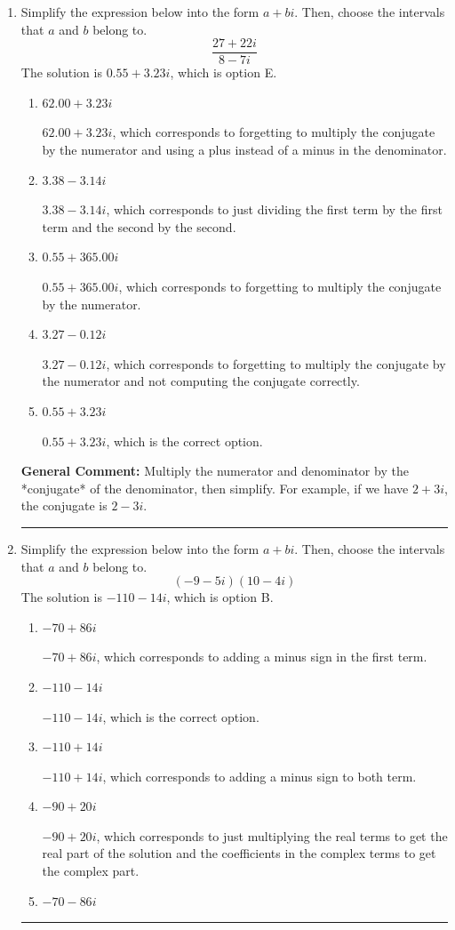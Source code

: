 \documentclass{extbook}[14pt]
\newcommand{\litem}[1]{\item #1

\rule{\textwidth}{0.4pt}}
\begin{document}
\begin{enumerate}\litem{
Simplify the expression below into the form $a+bi$. Then, choose the intervals that $a$ and $b$ belong to.
\[ \frac{27  + 22 i}{8  - 7 i} \]The solution is \( 0.55  + 3.23 i \), which is option E.\begin{enumerate}[label=\Alph*.]
\item \( 62.00  + 3.23 i \)

 $62.00  + 3.23 i$, which corresponds to forgetting to multiply the conjugate by the numerator and using a plus instead of a minus in the denominator.
\item \( 3.38  - 3.14 i \)

 $3.38  - 3.14 i$, which corresponds to just dividing the first term by the first term and the second by the second.
\item \( 0.55  + 365.00 i \)

 $0.55  + 365.00 i$, which corresponds to forgetting to multiply the conjugate by the numerator.
\item \( 3.27  - 0.12 i \)

 $3.27  - 0.12 i$, which corresponds to forgetting to multiply the conjugate by the numerator and not computing the conjugate correctly.
\item \( 0.55  + 3.23 i \)

 $0.55  + 3.23 i$, which is the correct option.
\end{enumerate}

\textbf{General Comment:} Multiply the numerator and denominator by the *conjugate* of the denominator, then simplify. For example, if we have $2+3i$, the conjugate is $2-3i$.
}
\litem{
Simplify the expression below into the form $a+bi$. Then, choose the intervals that $a$ and $b$ belong to.
\[ (-9  - 5 i)(10  - 4 i) \]The solution is \( -110  - 14 i \), which is option B.\begin{enumerate}[label=\Alph*.]
\item \( -70  + 86 i \)

$-70  + 86 i$, which corresponds to adding a minus sign in the first term.
\item \( -110  - 14 i \)

$-110  - 14 i$, which is the correct option.
\item \( -110  + 14 i \)

$-110  + 14 i$, which corresponds to adding a minus sign to both term.
\item \( -90  + 20 i \)

$-90  + 20 i$, which corresponds to just multiplying the real terms to get the real part of the solution and the coefficients in the complex terms to get the complex part.
\item \( -70  - 86 i \)


\end{enumerate}}
\end{enumerate}
\end{document}

